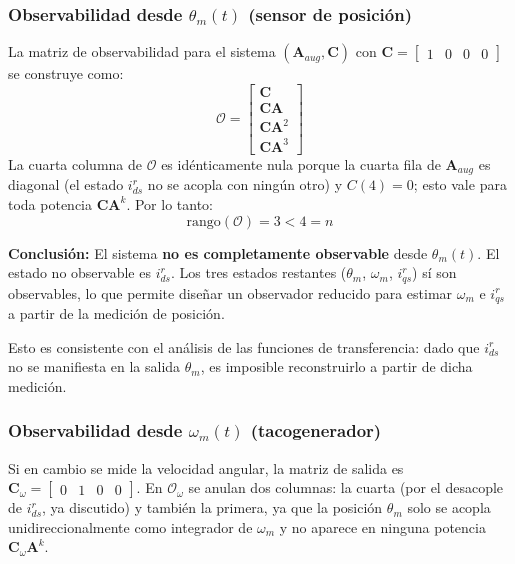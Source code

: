 \documentclass[12pt, a4paper,journal, onecolumn, compsoc]{IEEEtran}
\begin{document}
\subsubsection{Observabilidad desde \texorpdfstring{$\theta_m(t)$}{theta_m(t)} (sensor de posición)}
La matriz de observabilidad para el sistema $(\bm{A}_{aug}, \bm{C})$ con $\bm{C} = \begin{bmatrix} 1 & 0 & 0 & 0 \end{bmatrix}$ se construye como:
\begin{equation}
    \mathcal{O} = \begin{bmatrix} \bm{C} \\ \bm{C}\bm{A} \\ \bm{C}\bm{A}^2 \\ \bm{C}\bm{A}^3 \end{bmatrix}
\end{equation}
La cuarta columna de $\mathcal{O}$ es idénticamente nula porque la cuarta fila de $\bm{A}_{aug}$ es diagonal (el estado $i_{ds}^r$ no se acopla con ningún otro) y $C(4)=0$; esto vale para toda potencia $\bm{C}\bm{A}^k$. Por lo tanto:
\begin{equation}
    \text{rango}(\mathcal{O}) = 3 < 4 = n
\end{equation}

\textbf{Conclusión:} El sistema \textbf{no es completamente observable} desde $\theta_m(t)$. El estado no observable es $i_{ds}^r$. Los tres estados restantes ($\theta_m$, $\omega_m$, $i_{qs}^r$) sí son observables, lo que permite diseñar un observador reducido para estimar $\omega_m$ e $i_{qs}^r$ a partir de la medición de posición.

Esto es consistente con el análisis de las funciones de transferencia: dado que $i_{ds}^r$ no se manifiesta en la salida $\theta_m$, es imposible reconstruirlo a partir de dicha medición.

\subsubsection{Observabilidad desde \texorpdfstring{$\omega_m(t)$}{omega_m(t)} (tacogenerador)}
Si en cambio se mide la velocidad angular, la matriz de salida es $\bm{C}_\omega = \begin{bmatrix} 0 & 1 & 0 & 0 \end{bmatrix}$. En $\mathcal{O}_\omega$ se anulan dos columnas: la cuarta (por el desacople de $i_{ds}^r$, ya discutido) y también la primera, ya que la posición $\theta_m$ solo se acopla unidireccionalmente como integrador de $\omega_m$ y no aparece en ninguna potencia $\bm{C}_\omega\bm{A}^k$.
\end{document}
